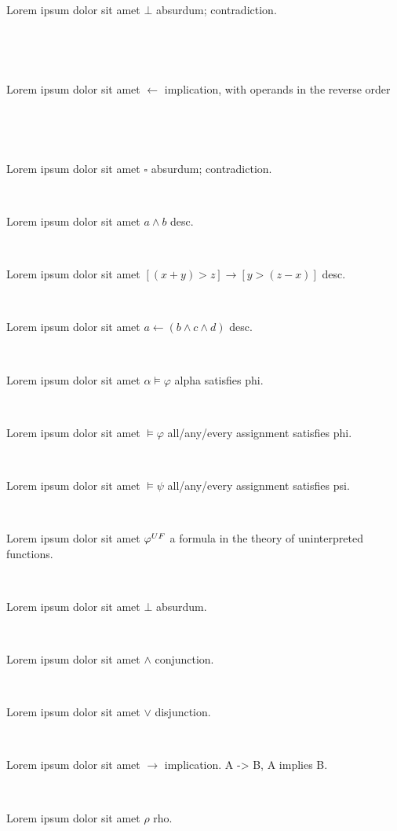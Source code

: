 \documentclass[12pt]{article}
\begin{document}
\centerline{~}

\centerline{~}

Lorem ipsum dolor sit amet $ \bot $ absurdum; contradiction.

\centerline{~}

\centerline{~}

Lorem ipsum dolor sit amet $ \leftarrow  $ implication, with operands in the reverse order

\centerline{~}

\centerline{~}

Lorem ipsum dolor sit amet $ \square $ absurdum; contradiction.

\centerline{~}


Lorem ipsum dolor sit amet $ a \wedge b $ desc.

\centerline{~}


Lorem ipsum dolor sit amet $ [ ( x + y ) > z ] \rightarrow [ y > ( z - x ) ] $ desc.

\centerline{~}


Lorem ipsum dolor sit amet $ a \leftarrow ( b \wedge c \wedge d )  $ desc.

\centerline{~}

Lorem ipsum dolor sit amet $ \alpha \vDash \varphi $ alpha satisfies phi.

\centerline{~}

Lorem ipsum dolor sit amet $ \vDash \varphi $ all/any/every assignment satisfies phi.

\centerline{~}

Lorem ipsum dolor sit amet $ \vDash \psi $ all/any/every assignment satisfies psi.

\centerline{~}

Lorem ipsum dolor sit amet $ \varphi^{\scriptsize UF} $ a formula in the theory of uninterpreted functions.

\centerline{~}

Lorem ipsum dolor sit amet $ \bot $ absurdum.

\centerline{~}

Lorem ipsum dolor sit amet $ \wedge $ conjunction.

\centerline{~}

Lorem ipsum dolor sit amet $ \vee $ disjunction.

\centerline{~}

Lorem ipsum dolor sit amet $ \rightarrow $ implication.  A -> B,  A implies B.

\centerline{~}

Lorem ipsum dolor sit amet $ \rho $ rho.
\end{document}
